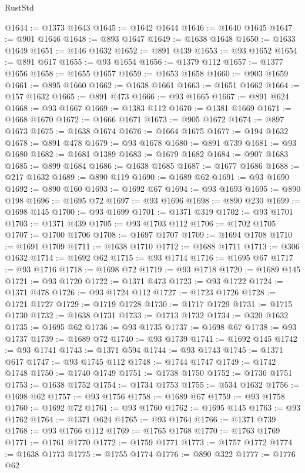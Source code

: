 \begin{lexlean}{RustStd}
\begin{coremodule}
@1644 := @1373 @1643
@1645 := @1642 @1644
@1646 := @1640 @1645
@1647 := @901 @1646
@1648 := @893 @1647
@1649 := @1638 @1648
@1650 := @1633 @1649
@1651 := @146 @1632
@1652 := @891 @439
@1653 := @93 @1652
@1654 := @891 @617
@1655 := @93 @1654
@1656 := @1379 @112
@1657 := @1377 @1656
@1658 := @1655 @1657
@1659 := @1653 @1658
@1660 := @903 @1659
@1661 := @895 @1660
@1662 := @1638 @1661
@1663 := @1651 @1662
@1664 := @157 @1632
@1665 := @891 @473
@1666 := @93 @1665
@1667 := @891 @624
@1668 := @93 @1667
@1669 := @1383 @112
@1670 := @1381 @1669
@1671 := @1668 @1670
@1672 := @1666 @1671
@1673 := @905 @1672
@1674 := @897 @1673
@1675 := @1638 @1674
@1676 := @1664 @1675
@1677 := @194 @1632
@1678 := @891 @478
@1679 := @93 @1678
@1680 := @891 @739
@1681 := @93 @1680
@1682 := @1681 @1389
@1683 := @1679 @1682
@1684 := @907 @1683
@1685 := @899 @1684
@1686 := @1638 @1685
@1687 := @1677 @1686
@1688 := @217 @1632
@1689 := @890 @119
@1690 := @1689 @62
@1691 := @93 @1690
@1692 := @890 @160
@1693 := @1692 @67
@1694 := @93 @1693
@1695 := @890 @198
@1696 := @1695 @72
@1697 := @93 @1696
@1698 := @890 @230
@1699 := @1698 @145
@1700 := @93 @1699
@1701 := @1371 @319
@1702 := @93 @1701
@1703 := @1371 @439
@1705 := @93 @1703 @112
@1706 := @1702 @1705
@1707 := @1700 @1706
@1708 := @1697 @1707
@1709 := @1694 @1708
@1710 := @1691 @1709
@1711 := @1638 @1710
@1712 := @1688 @1711
@1713 := @306 @1632
@1714 := @1692 @62
@1715 := @93 @1714
@1716 := @1695 @67
@1717 := @93 @1716
@1718 := @1698 @72
@1719 := @93 @1718
@1720 := @1689 @145
@1721 := @93 @1720
@1722 := @1371 @473
@1723 := @93 @1722
@1724 := @1371 @478
@1726 := @93 @1724 @112
@1727 := @1723 @1726
@1728 := @1721 @1727
@1729 := @1719 @1728
@1730 := @1717 @1729
@1731 := @1715 @1730
@1732 := @1638 @1731
@1733 := @1713 @1732
@1734 := @320 @1632
@1735 := @1695 @62
@1736 := @93 @1735
@1737 := @1698 @67
@1738 := @93 @1737
@1739 := @1689 @72
@1740 := @93 @1739
@1741 := @1692 @145
@1742 := @93 @1741
@1743 := @1371 @594
@1744 := @93 @1743
@1745 := @1371 @617
@1747 := @93 @1745 @112
@1748 := @1744 @1747
@1749 := @1742 @1748
@1750 := @1740 @1749
@1751 := @1738 @1750
@1752 := @1736 @1751
@1753 := @1638 @1752
@1754 := @1734 @1753
@1755 := @534 @1632
@1756 := @1698 @62
@1757 := @93 @1756
@1758 := @1689 @67
@1759 := @93 @1758
@1760 := @1692 @72
@1761 := @93 @1760
@1762 := @1695 @145
@1763 := @93 @1762
@1764 := @1371 @624
@1765 := @93 @1764
@1766 := @1371 @739
@1768 := @93 @1766 @112
@1769 := @1765 @1768
@1770 := @1763 @1769
@1771 := @1761 @1770
@1772 := @1759 @1771
@1773 := @1757 @1772
@1774 := @1638 @1773
@1775 := @1755 @1774
@1776 := @890 @322
@1777 := @1776 @62

\end{coremodule}
\end{lexlean}
